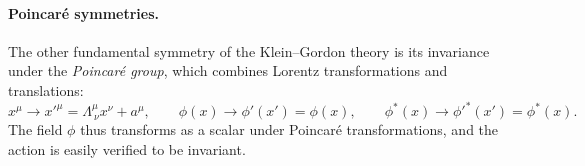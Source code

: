 \paragraph{Poincaré symmetries.}
The other fundamental symmetry of the Klein--Gordon theory is its invariance under the \textit{Poincaré group}, which combines Lorentz transformations and translations:
\begin{equation}
    x^{\mu} \rightarrow x'^{\mu} = \Lambda^{\mu}_{\ \nu} x^{\nu} + a^{\mu},
    \qquad
    \phi(x) \rightarrow \phi'(x') = \phi(x),
    \qquad
    \phi^{\ast}(x) \rightarrow \phi'^{\ast}(x') = \phi^{\ast}(x).
    \label{eq:Poincaré_symmetries}
\end{equation}
The field \(\phi\) thus transforms as a scalar under Poincaré transformations, and the action is easily verified to be invariant.

